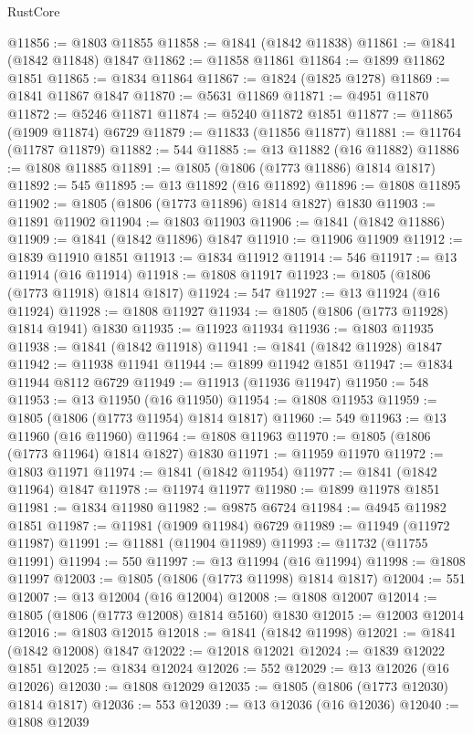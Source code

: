 \begin{lexlean}{RustCore}
\begin{coremodule}
@11856 := @1803 @11855
@11858 := @1841 (@1842 @11838)
@11861 := @1841 (@1842 @11848) @1847
@11862 := @11858 @11861
@11864 := @1899 @11862 @1851
@11865 := @1834 @11864
@11867 := @1824 (@1825 @1278)
@11869 := @1841 @11867 @1847
@11870 := @5631 @11869
@11871 := @4951 @11870
@11872 := @5246 @11871
@11874 := @5240 @11872 @1851
@11877 := @11865 (@1909 @11874) @6729
@11879 := @11833 (@11856 @11877)
@11881 := @11764 (@11787 @11879)
@11882 := 544
@11885 := @13 @11882 (@16 @11882)
@11886 := @1808 @11885
@11891 := @1805 (@1806 (@1773 @11886) @1814 @1817)
@11892 := 545
@11895 := @13 @11892 (@16 @11892)
@11896 := @1808 @11895
@11902 := @1805 (@1806 (@1773 @11896) @1814 @1827) @1830
@11903 := @11891 @11902
@11904 := @1803 @11903
@11906 := @1841 (@1842 @11886)
@11909 := @1841 (@1842 @11896) @1847
@11910 := @11906 @11909
@11912 := @1839 @11910 @1851
@11913 := @1834 @11912
@11914 := 546
@11917 := @13 @11914 (@16 @11914)
@11918 := @1808 @11917
@11923 := @1805 (@1806 (@1773 @11918) @1814 @1817)
@11924 := 547
@11927 := @13 @11924 (@16 @11924)
@11928 := @1808 @11927
@11934 := @1805 (@1806 (@1773 @11928) @1814 @1941) @1830
@11935 := @11923 @11934
@11936 := @1803 @11935
@11938 := @1841 (@1842 @11918)
@11941 := @1841 (@1842 @11928) @1847
@11942 := @11938 @11941
@11944 := @1899 @11942 @1851
@11947 := @1834 @11944 @8112 @6729
@11949 := @11913 (@11936 @11947)
@11950 := 548
@11953 := @13 @11950 (@16 @11950)
@11954 := @1808 @11953
@11959 := @1805 (@1806 (@1773 @11954) @1814 @1817)
@11960 := 549
@11963 := @13 @11960 (@16 @11960)
@11964 := @1808 @11963
@11970 := @1805 (@1806 (@1773 @11964) @1814 @1827) @1830
@11971 := @11959 @11970
@11972 := @1803 @11971
@11974 := @1841 (@1842 @11954)
@11977 := @1841 (@1842 @11964) @1847
@11978 := @11974 @11977
@11980 := @1899 @11978 @1851
@11981 := @1834 @11980
@11982 := @9875 @6724
@11984 := @4945 @11982 @1851
@11987 := @11981 (@1909 @11984) @6729
@11989 := @11949 (@11972 @11987)
@11991 := @11881 (@11904 @11989)
@11993 := @11732 (@11755 @11991)
@11994 := 550
@11997 := @13 @11994 (@16 @11994)
@11998 := @1808 @11997
@12003 := @1805 (@1806 (@1773 @11998) @1814 @1817)
@12004 := 551
@12007 := @13 @12004 (@16 @12004)
@12008 := @1808 @12007
@12014 := @1805 (@1806 (@1773 @12008) @1814 @5160) @1830
@12015 := @12003 @12014
@12016 := @1803 @12015
@12018 := @1841 (@1842 @11998)
@12021 := @1841 (@1842 @12008) @1847
@12022 := @12018 @12021
@12024 := @1839 @12022 @1851
@12025 := @1834 @12024
@12026 := 552
@12029 := @13 @12026 (@16 @12026)
@12030 := @1808 @12029
@12035 := @1805 (@1806 (@1773 @12030) @1814 @1817)
@12036 := 553
@12039 := @13 @12036 (@16 @12036)
@12040 := @1808 @12039

\end{coremodule}
\end{lexlean}
